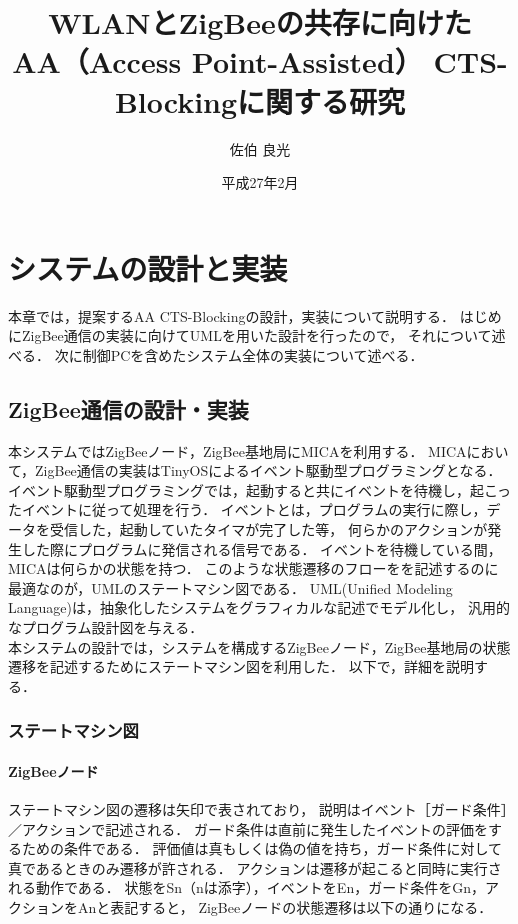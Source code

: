 \documentclass[12pt]{jreport}
\date{平成27年2月}
\title{\fontsize{15.5pt}{25pt}\selectfont WLANとZigBeeの共存に向けた\\AA（Access Point-Assisted） CTS-Blockingに関する研究}
\author{佐伯 良光}
\begin{document}
\maketitle


\chapter{システムの設計と実装}\label{implement}%

本章では，提案するAA CTS-Blockingの設計，実装について説明する．
はじめにZigBee通信の実装に向けてUMLを用いた設計を行ったので，
それについて述べる．
次に制御PCを含めたシステム全体の実装について述べる．\\

\section{ZigBee通信の設計・実装}

本システムではZigBeeノード，ZigBee基地局にMICAを利用する．
MICAにおいて，ZigBee通信の実装はTinyOSによるイベント駆動型プログラミングとなる．
イベント駆動型プログラミングでは，起動すると共にイベントを待機し，起こったイベントに従って処理を行う．
イベントとは，プログラムの実行に際し，データを受信した，起動していたタイマが完了した等，
何らかのアクションが発生した際にプログラムに発信される信号である．
イベントを待機している間，MICAは何らかの状態を持つ．
このような状態遷移のフローをを記述するのに最適なのが，UMLのステートマシン図である．
UML(Unified Modeling Language)は，抽象化したシステムをグラフィカルな記述でモデル化し，
汎用的なプログラム設計図を与える．\\
本システムの設計では，システムを構成するZigBeeノード，ZigBee基地局の状態遷移を記述するためにステートマシン図を利用した．
以下で，詳細を説明する．

\subsection{ステートマシン図}

\subsubsection{ZigBeeノード}

ステートマシン図の遷移は矢印で表されており，
説明はイベント［ガード条件］／アクションで記述される．
ガード条件は直前に発生したイベントの評価をするための条件である．
評価値は真もしくは偽の値を持ち，ガード条件に対して真であるときのみ遷移が許される．
アクションは遷移が起こると同時に実行される動作である．
状態をSn（nは添字），イベントをEn，ガード条件をGn，アクションをAnと表記すると，
ZigBeeノードの状態遷移は以下の通りになる．
\end{document}

